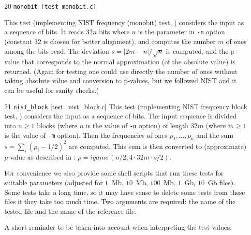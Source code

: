 \documentclass[12pt,a4paper,fullpage]{article}
\begin{document}
\begin{description}
\item{20} \texttt{monobit [test\_monobit.c]}

This test (implementing NIST frequency (monobit) test, \cite[Section 2.1]{nistsp800-22-1a}) considers the input as a sequence of bits. It reads $32n$ bits where $n$ is the parameter in \texttt{-n} option (constant $32$ is chosen for better alignment), and computes the number $m$ of ones among the bits read. The deviation $s=|2m-n|/\sqrt{n}$ is computed, and the p-value that corresponds to the normal approximation (of the absolute value) is returned. (Again for testing one could use directly the number of ones without taking absolute value and conversion to p-values, but we followed NIST and it can be useful for sanity checks.)

\item{21} \texttt{nist\_block} [test\_nist\_block.c]
This test (implementing NIST frequency block test, \cite[Section 2.2]{nistsp800-22-1a}) considers the input as a sequence of bits. The input sequence is divided into $n\ge1$ blocks (where $n$ is the value of \texttt{-n} option) of length $32m$ (where $m\ge 1$ is the value of \texttt{-m} option). Then the frequencies of ones $p_1,\ldots,p_n$ and the sum $s=\sum_i (p_i-1/2)^2$ are computed. This sum is then converted to (approximate) $p$-value as described in \cite[Section 2.2]{nistsp800-22-1a}: $p=\textit{igamc}\,(n/2,4\cdot 32m\cdot s/2)$.

\end{description}

For convenience we also provide  some shell scripts that run these tests for suitable parameters (adjusted for $1$~Mb, $10$~Mb, $100$~Mb, $1$~Gb, $10$~Gb files). Some tests take a long time, so it may have sense to delete some tests from these files if they take too much time. Two arguments are required: the name of the tested file and the name of the reference file.

A short reminder to be taken into account when interpreting the test values:
\end{document}
